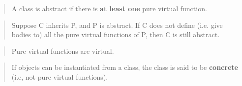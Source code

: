 \documentclass[
]{article}
\begin{document}
\begin{quote}
\end{quote}

\begin{quote}
A class is abstract if there is \textbf{at least one} pure virtual
function.
\end{quote}

\begin{quote}
Suppose C inherits P, and P is abstract. If C does not define (i.e. give
bodies to) all the pure virtual functions of P, then C is still
abstract.
\end{quote}

\begin{quote}
\end{quote}

\begin{quote}
Pure virtual functions are virtual.
\end{quote}

\begin{quote}
\end{quote}

\begin{quote}
If objects can be instantiated from a class, the class is said to be
\textbf{concrete} (i.e, not pure virtual functions).
\end{quote}
\end{document}
